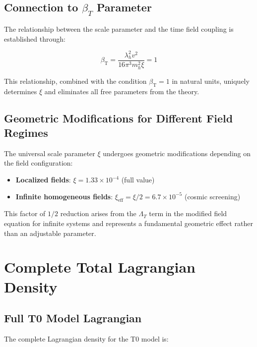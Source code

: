 \documentclass[12pt,a4paper]{article}
\newcommand{\betaT}{\beta_{\text{T}}}
\newcommand{\xipar}{\xi}
\theoremstyle{definition}
\theoremstyle{remark}
\begin{document}
	\subsection{Connection to $\beta_T$ Parameter}
	\label{subsec:beta_t_connection}
	
	The relationship between the scale parameter and the time field coupling is established through:
	
	\begin{equation}
		\betaT = \frac{\lambda_h^2 v^2}{16\pi^3 m_h^2 \xi} = 1
		\label{eq:beta_t_relationship}
	\end{equation}
	
	This relationship, combined with the condition $\betaT = 1$ in natural units, uniquely determines $\xipar$ and eliminates all free parameters from the theory.
	
	\subsection{Geometric Modifications for Different Field Regimes}
	\label{subsec:geometric_modifications}
	
	The universal scale parameter $\xipar$ undergoes geometric modifications depending on the field configuration:
	
	\begin{itemize}
		\item \textbf{Localized fields}: $\xipar = 1.33 \times 10^{-4}$ (full value)
		\item \textbf{Infinite homogeneous fields}: $\xi_{\text{eff}} = \xipar/2 = 6.7 \times 10^{-5}$ (cosmic screening)
	\end{itemize}
	
	This factor of $1/2$ reduction arises from the $\Lambda_T$ term in the modified field equation for infinite systems and represents a fundamental geometric effect rather than an adjustable parameter.
	
	\section{Complete Total Lagrangian Density}
	\label{sec:total_lagrangian}
	
	\subsection{Full T0 Model Lagrangian}
	\label{subsec:full_lagrangian}
	
	The complete Lagrangian density for the T0 model is:
	
\end{document}
